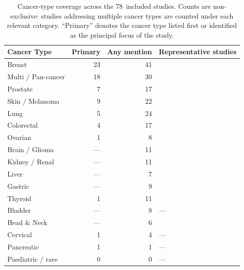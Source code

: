 \begin{table}[htbp]
  \centering
  \caption{Cancer-type coverage across the 78~included studies.
           Counts are non-exclusive: studies addressing multiple cancer
           types are counted under each relevant category.
           ``Primary'' denotes the cancer type listed first or
           identified as the principal focus of the study.}
  \label{tab:cancer_coverage}
  \small
  \begin{tabularx}{\linewidth}{@{}l r r X@{}}
    \toprule
    \textbf{Cancer Type} & \textbf{Primary} & \textbf{Any mention} & \textbf{Representative studies} \\
    \midrule
    Breast               & 23 & 41 & \citep{vaidya2024demographic, howard2021site, lin2025contrastive} \\
    Multi / Pan-cancer   & 18 & 30 & \citep{dehkharghanian2023biased, howard2021site, tasci2022bias} \\
    Prostate             &  7 & 17 & \citep{vaidya2024demographic, dehkharghanian2023biased} \\
    Skin / Melanoma      &  9 & 22 & \citep{chen2025predicting, vaidya2024demographic, daneshjou2022disparities} \\
    Lung                 &  5 & 24 & \citep{huang2025knowledge, komen2024batch, howard2021site} \\
    Colorectal           &  4 & 17 & \citep{vaidya2024demographic, howard2021site} \\
    Ovarian              &  1 &  8 & \citep{ahmed2025robust} \\
    Brain / Glioma       & --- & 11 & \citep{howard2021site, tasci2022bias} \\
    Kidney / Renal       & --- & 11 & \citep{howard2021site} \\
    Liver                & --- &  7 & \citep{howard2021site} \\
    Gastric              & --- &  9 & \citep{huang2025knowledge} \\
    Thyroid              &  1 & 11 & \citep{dehkharghanian2023biased} \\
    Bladder              & --- &  8 & --- \\
    Head \& Neck         & --- &  6 & \citep{howard2021site} \\
    Cervical             &  1 &  4 & --- \\
    Pancreatic           &  1 &  1 & --- \\
    Paediatric / rare    &  0 &  0 & --- \\
    \bottomrule
  \end{tabularx}
\end{table}

